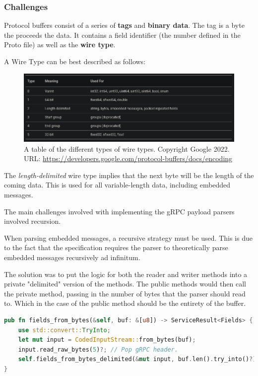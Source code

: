 \documentclass[a4paper,12pt]{report}
\begin{document}
\subsubsection{Challenges}

Protocol buffers consist of a series of \textbf{tags} and \textbf{binary data}.
The tag is a byte the proceeds the data. It contains a field identifier (the number defined in the Proto file) as well as the \textbf{wire type}.

A Wire Type can be best described as follows:

\begin{figure}[hbt!]
    \centering
    \includegraphics[width=\linewidth]{wire.png}
    \caption{A table of the different types of wire types. Copyright Google 2022. URL: \href{https://developers.google.com/protocol-buffers/docs/encoding}{https://developers.google.com/protocol-buffers/docs/encoding}}
    \label{fig:admin}
\end{figure}
\newpage

The \textit{length-delimited} wire type implies that the next byte will be the length of the coming data. This is used for all variable-length data,
including embedded messages.

The main challenges involved with implementing the gRPC payload parsers involved recursion.

When parsing embedded messages, a recursive strategy must be used. This is due to the fact that the specification requires the parser to theoretically parse embedded messages recursively ad infinitum.

The solution was to put the logic for both the reader and writer methods into a private "delimited" version of the methods.
The public methods would then call the private method, passing in the number of bytes that the parser should read to. Which in the case of
the public method should be the entirety of the buffer.

\begin{lstlisting}[language=Rust]
pub fn fields_from_bytes(&self, buf: &[u8]) -> ServiceResult<Fields> {
    use std::convert::TryInto;
    let mut input = CodedInputStream::from_bytes(buf);
    input.read_raw_bytes(5)?; // Pop gRPC header.
    self.fields_from_bytes_delimited(&mut input, buf.len().try_into()?)
}
\end{lstlisting}
\end{document}
